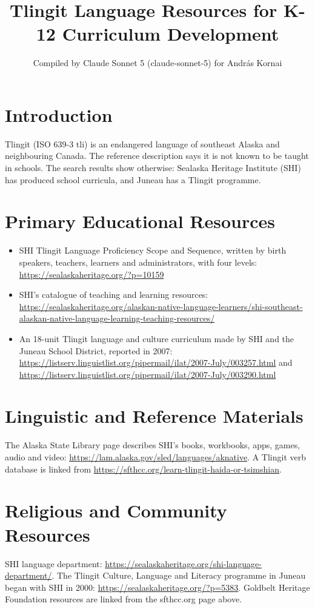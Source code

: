 \documentclass[12pt]{article}
\title{Tlingit Language Resources for K-12 Curriculum Development}
\author{Compiled by Claude Sonnet 5 (claude-sonnet-5) for Andr\'as Kornai}
\date{}
\begin{document}
\maketitle

\section{Introduction}
Tlingit (ISO 639-3 tli) is an endangered language of southeast Alaska and neighbouring Canada. The reference description says it is not known to be taught in schools. The search results show otherwise: Sealaska Heritage Institute (SHI) has produced school curricula, and Juneau has a Tlingit programme.

\section{Primary Educational Resources}
\begin{itemize}
\item SHI Tlingit Language Proficiency Scope and Sequence, written by birth speakers, teachers, learners and administrators, with four levels: \url{https://sealaskaheritage.org/?p=10159}
\item SHI's catalogue of teaching and learning resources: \url{https://sealaskaheritage.org/alaskan-native-language-learners/shi-southeast-alaskan-native-language-learning-teaching-resources/}
\item An 18-unit Tlingit language and culture curriculum made by SHI and the Juneau School District, reported in 2007: \url{https://listserv.linguistlist.org/pipermail/ilat/2007-July/003257.html} and \url{https://listserv.linguistlist.org/pipermail/ilat/2007-July/003290.html}
\end{itemize}

\section{Linguistic and Reference Materials}
The Alaska State Library page describes SHI's books, workbooks, apps, games, audio and video: \url{https://lam.alaska.gov/sled/languages/aknative}. A Tlingit verb database is linked from \url{https://sfthcc.org/learn-tlingit-haida-or-tsimshian}.

\section{Religious and Community Resources}
SHI language department: \url{https://sealaskaheritage.org/shi-language-department/}. The Tlingit Culture, Language and Literacy programme in Juneau began with SHI in 2000: \url{https://sealaskaheritage.org/?p=5383}. Goldbelt Heritage Foundation resources are linked from the sfthcc.org page above.
\end{document}
